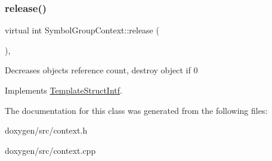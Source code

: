 \mbox{\label{class_symbol_group_context_aa5fd71b51aed2de864d296319b88b114}} 
\subsubsection{\texorpdfstring{release()}{release()}}
{\footnotesize\ttfamily virtual int Symbol\+Group\+Context\+::release (\begin{DoxyParamCaption}{ }\end{DoxyParamCaption})\hspace{0.3cm}{\ttfamily [inline]}, {\ttfamily [virtual]}}

Decreases object\textquotesingle{}s reference count, destroy object if 0 

Implements \mbox{\hyperlink{class_template_struct_intf_a3dce7dd29d3f66a8080b40578e8a5045}{Template\+Struct\+Intf}}.



The documentation for this class was generated from the following files\+:\begin{DoxyCompactItemize}
\item 
doxygen/src/context.\+h\item 
doxygen/src/context.\+cpp\end{DoxyCompactItemize}
